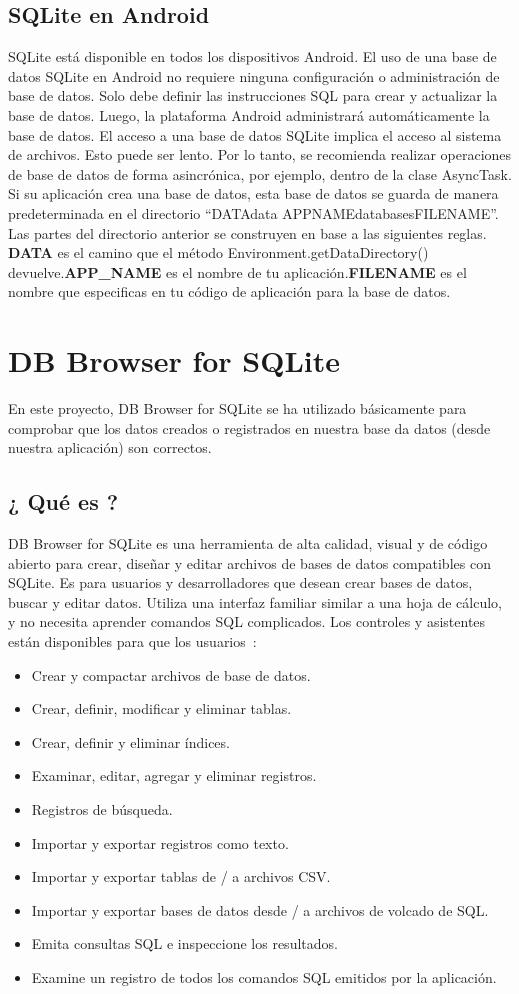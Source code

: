 \subsection{SQLite en Android}
SQLite está disponible en todos los dispositivos Android. El uso de una base de datos SQLite en Android no requiere ninguna configuración o administración de base de datos.
Solo debe definir las instrucciones SQL para crear y actualizar la base de datos. Luego, la plataforma Android administrará automáticamente la base de datos.
El acceso a una base de datos SQLite implica el acceso al sistema de archivos. Esto puede ser lento. Por lo tanto, se recomienda realizar operaciones de base de datos de forma asincrónica, por ejemplo, dentro de la clase AsyncTask. Si su aplicación crea una base de datos, esta base de datos se guarda de manera predeterminada en el directorio ``DATA\/data\/ APP\/NAME\/databases\/FILENAME''. Las partes del directorio anterior se construyen en base a las siguientes reglas. \textbf{DATA} es el camino que el método Environment.getDataDirectory() devuelve.\textbf{APP\_NAME} es el nombre de tu aplicación.\textbf{FILENAME} es el nombre que especificas en tu código de aplicación para la base de datos.

\section{DB Browser for SQLite}
En este proyecto, DB Browser for SQLite se ha utilizado básicamente para comprobar que los datos creados o registrados en nuestra base da datos (desde nuestra aplicación) son correctos.
\subsection{¿ Qué es ?}
DB Browser for SQLite es una herramienta de alta calidad, visual y de código abierto para crear, diseñar y editar archivos de bases de datos compatibles con SQLite. Es para usuarios y desarrolladores que desean crear bases de datos, buscar y editar datos. Utiliza una interfaz familiar similar a una hoja de cálculo, y no necesita aprender comandos SQL complicados. Los controles y asistentes están disponibles para que los usuarios~\cite{sqlitebrowser}:
\begin{itemize}
	\item Crear y compactar archivos de base de datos.
	\item Crear, definir, modificar y eliminar tablas.
	\item Crear, definir y eliminar índices.
	\item Examinar, editar, agregar y eliminar registros.
	\item Registros de búsqueda.
	\item Importar y exportar registros como texto.
	\item Importar y exportar tablas de / a archivos CSV.
	\item Importar y exportar bases de datos desde / a archivos de volcado de SQL.
	\item Emita consultas SQL e inspeccione los resultados.
	\item Examine un registro de todos los comandos SQL emitidos por la aplicación.

\end{itemize}
